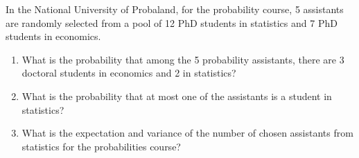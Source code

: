 \documentclass[12pt,thmsa]{article}\usepackage[]{graphicx}\usepackage[]{color}
\begin{document}
In the National University of Probaland, for the probability course, 5 assistants are randomly selected from a pool of 12 PhD students in statistics and 7 PhD students in economics.

\begin{enumerate}
\item What is the probability that among the 5 probability assistants, there are 3 doctoral students in economics and 2 in statistics?
\item What is the probability that at most one of the assistants is a student in statistics?
\item What is the expectation and variance of the number of chosen assistants from statistics for the probabilities course?
\end{enumerate}
\end{document}
